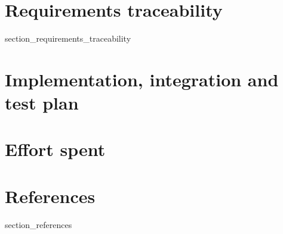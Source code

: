 \documentclass[a4paper]{article}
\begin{document}
\newpage

\section{Requirements traceability}\label{requirements_traceability}

{section_requirements_traceability}

\newpage

\section{Implementation, integration and test plan}\label{implementation_integration_test_plan}

\newpage

\section{Effort spent}\label{effort_spent}

\section{References}\label{references}

{section_references}
\end{document}
